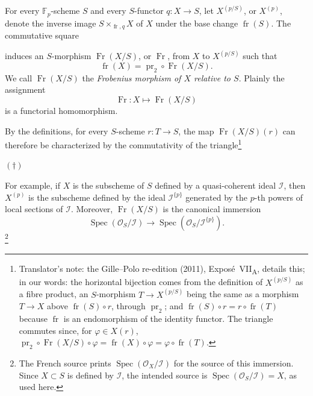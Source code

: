 For every \(\mathbb F_p\)-scheme \(S\) and every \(S\)-functor
\(q:X\to S\), let \(X^{(p/S)}\), or \(X^{(p)}\), denote the inverse
image \(S\times_{\operatorname{fr},q}X\) of \(X\) under the base change
\(\operatorname{fr}(S)\). The commutative square
\begin{center}
  \label{sga3:VIIA:4.1-absolute-frobenius-square}
  
\end{center}
induces an \(S\)-morphism \(\operatorname{Fr}(X/S)\), or \(\operatorname{Fr}\),
from \(X\) to \(X^{(p/S)}\) such that
\[
  \operatorname{fr}(X)
  =
  \operatorname{pr}_2\circ\operatorname{Fr}(X/S).
\]
We call \(\operatorname{Fr}(X/S)\) the \emph{Frobenius morphism of
\(X\) relative to \(S\)}. Plainly the assignment
\[
  \operatorname{Fr}:X\longmapsto\operatorname{Fr}(X/S)
\]
is a functorial homomorphism.

By the definitions, for every \(S\)-scheme \(r:T\to S\), the map
\(\operatorname{Fr}(X/S)(r)\) can therefore be characterized by the
commutativity of the triangle\footnote{Translator's note: the
Gille--Polo re-edition (2011), Expos\'e~VII\textsubscript{A}, details
this; in our words: the horizontal bijection comes from the definition
of \(X^{(p/S)}\) as a fibre product, an \(S\)-morphism
\(T\to X^{(p/S)}\) being the same as a morphism \(T\to X\) above
\(\operatorname{fr}(S)\circ r\), through \(\operatorname{pr}_2\); and
\(\operatorname{fr}(S)\circ r=r\circ\operatorname{fr}(T)\) because
\(\operatorname{fr}\) is an endomorphism of the identity functor. The
triangle commutes since, for \(\varphi\in X(r)\),
\(\operatorname{pr}_2\circ\operatorname{Fr}(X/S)\circ\varphi
=\operatorname{fr}(X)\circ\varphi=\varphi\circ\operatorname{fr}(T)\).}
\begin{center}
\((\dagger)\qquad\)%
\end{center}

For example, if \(X\) is the subscheme of \(S\) defined by a
quasi-coherent ideal \(\mathcal I\), then \(X^{(p)}\) is the subscheme
defined by the ideal \(\mathcal I^{\{p\}}\) generated by the \(p\)-th
powers of local sections of \(\mathcal I\). Moreover,
\(\operatorname{Fr}(X/S)\) is the canonical immersion
\[
  \operatorname{Spec}(\mathcal O_S/\mathcal I)
  \longrightarrow
  \operatorname{Spec}(\mathcal O_S/\mathcal I^{\{p\}}).
\]
\footnote{The French source prints
\(\operatorname{Spec}(\mathcal O_X/\mathcal I)\) for the source of
this immersion. Since \(X\subset S\) is defined by \(\mathcal I\), the
intended source is
\(\operatorname{Spec}(\mathcal O_S/\mathcal I)=X\), as used here.}

